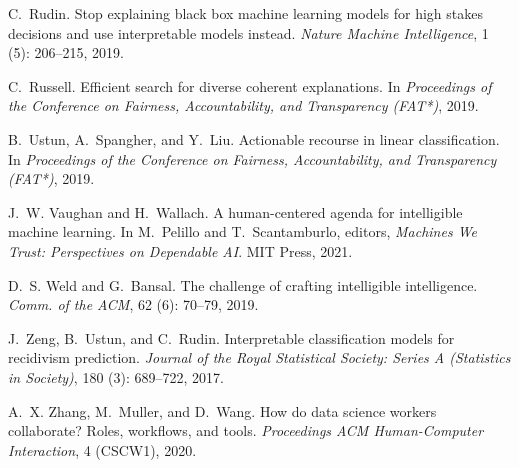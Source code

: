 \documentclass[11pt,dvipdfmx]{article}
\begin{document}
\begin{thebibliography}{10}
\begin{small}
C.~Rudin.
\newblock Stop explaining black box machine learning models for high stakes
  decisions and use interpretable models instead.
\newblock \emph{Nature Machine Intelligence}, 1 (5):
  206--215, 2019.

C.~Russell.
\newblock Efficient search for diverse coherent explanations.
\newblock In \emph{Proceedings of the Conference on Fairness, Accountability,
  and Transparency ({FAT*})}, 2019.

B.~Ustun, A.~Spangher, and Y.~Liu.
\newblock Actionable recourse in linear classification.
\newblock In \emph{Proceedings of the Conference on Fairness, Accountability,
  and Transparency ({FAT*})}, 2019.

J.~W. Vaughan and H.~Wallach.
\newblock A human-centered agenda for intelligible machine learning.
\newblock In M.~Pelillo and T.~Scantamburlo, editors, \emph{Machines We Trust:
  Perspectives on Dependable AI}. MIT Press, 2021.

D.~S. Weld and G.~Bansal.
\newblock The challenge of crafting intelligible intelligence.
\newblock \emph{Comm. of the ACM}, 62 (6): 70--79, 2019.

J.~Zeng, B.~Ustun, and C.~Rudin.
\newblock Interpretable classification models for recidivism prediction.
\newblock \emph{Journal of the Royal Statistical Society: Series A (Statistics
  in Society)}, 180 (3): 689--722, 2017.

A.~X. Zhang, M.~Muller, and D.~Wang.
\newblock How do data science workers collaborate? {R}oles, workflows, and
  tools.
\newblock \emph{Proceedings ACM Human-Computer Interaction}, 4 (CSCW1), 2020.


\end{small}
\end{thebibliography}


%
%
\end{document}
